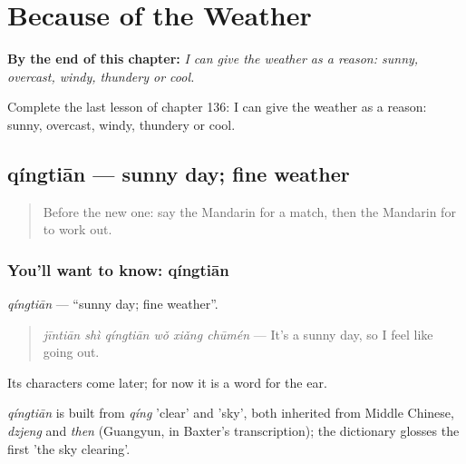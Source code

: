 
\chapter{Because of the Weather}
\label{ch:zh-because-of-the-weather}

\begin{chapteropening}
\textbf{By the end of this chapter:} \emph{I can give the weather as a reason: sunny, overcast, windy, thundery or cool.}

Complete the last lesson of chapter 136: I can give the weather as a reason: sunny, overcast, windy, thundery or cool.
\end{chapteropening}

\section[qíngtiān]{qíngtiān — sunny day; fine weather}

\label{lesson:ZH-C136-qingtian}



\begin{quote}
Before the new one: say the Mandarin for a match, then the Mandarin for to work out.
\end{quote}

\subsection*{You'll want to know: qíngtiān}
\emph{qíngtiān} — \textquotedblleft{}sunny day; fine weather\textquotedblright{}.

\begin{quote}
\emph{jīntiān shì qíngtiān wǒ xiǎng chūmén} — It's a sunny day, so I feel like going out.
\end{quote}

Its characters come later; for now it is a word for the ear.

\begin{cousinweb}
\emph{qíngtiān} is built from \emph{qíng} 'clear' and  'sky', both inherited from Middle Chinese, \emph{dzjeng} and \emph{then} (Guangyun, in Baxter's transcription); the dictionary glosses the first 'the sky clearing'.
\end{cousinweb}

